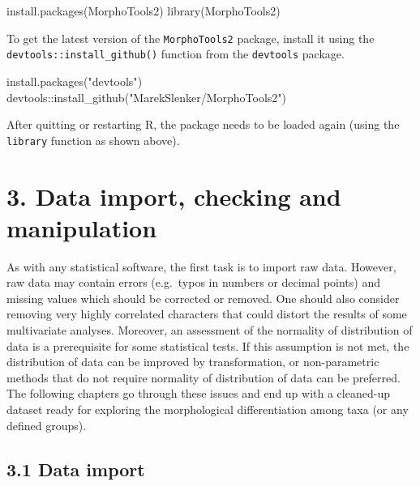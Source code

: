 \documentclass[
  11pt,
  a4paper]{article}
\newenvironment{Shaded}{\begin{snugshade}}{\end{snugshade}}
\newcommand{\FunctionTok}[1]{\textcolor[rgb]{0.00,0.00,0.00}{#1}}
\newcommand{\NormalTok}[1]{#1}
\newcommand{\SpecialCharTok}[1]{\textcolor[rgb]{0.00,0.00,0.00}{#1}}
\newcommand{\StringTok}[1]{\textcolor[rgb]{0.31,0.60,0.02}{#1}}
\begin{document}
\begin{Shaded}
\begin{Highlighting}[]
\FunctionTok{install.packages}\NormalTok{(MorphoTools2)}
\FunctionTok{library}\NormalTok{(MorphoTools2)}
\end{Highlighting}
\end{Shaded}

To get the latest version of the \texttt{MorphoTools2} package, install
it using the \texttt{devtools::install\_github()} function from the
\texttt{devtools} package.

\begin{Shaded}
\begin{Highlighting}[]
\FunctionTok{install.packages}\NormalTok{(}\StringTok{"devtools"}\NormalTok{)}
\NormalTok{devtools}\SpecialCharTok{::}\FunctionTok{install\_github}\NormalTok{(}\StringTok{"MarekSlenker/MorphoTools2"}\NormalTok{)}
\end{Highlighting}
\end{Shaded}

After quitting or restarting R, the package needs to be loaded again
(using the \texttt{library} function as shown above).

\hypertarget{data-import-checking-and-manipulation}{%
\section{3. Data import, checking and
manipulation}\label{data-import-checking-and-manipulation}}

As with any statistical software, the first task is to import raw data.
However, raw data may contain errors (e.g.~typos in numbers or decimal
points) and missing values which should be corrected or removed. One
should also consider removing very highly correlated characters that
could distort the results of some multivariate analyses. Moreover, an
assessment of the normality of distribution of data is a prerequisite
for some statistical tests. If this assumption is not met, the
distribution of data can be improved by transformation, or
non-parametric methods that do not require normality of distribution of
data can be preferred. The following chapters go through these issues
and end up with a cleaned-up dataset ready for exploring the
morphological differentiation among taxa (or any defined groups).

\hypertarget{data-import}{%
\subsection{3.1 Data import}\label{data-import}}
\end{document}
